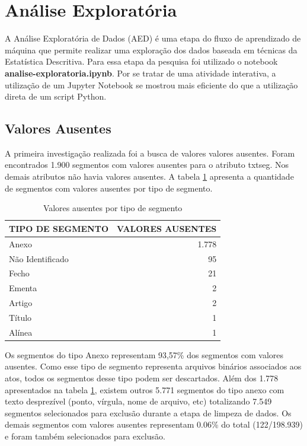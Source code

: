 \section{Análise Exploratória}

A Análise Exploratória de Dados (AED) é uma etapa do fluxo de aprendizado de máquina que permite realizar uma exploração dos dados baseada em técnicas da Estatística Descritiva. Para essa etapa da pesquisa foi utilizado o notebook \textbf{analise-exploratoria.ipynb}. Por se tratar de uma atividade interativa, a utilização de um Jupyter Notebook se mostrou mais eficiente do que a utilização direta de um script Python.

\subsection{Valores Ausentes}

A primeira investigação realizada foi a busca de valores valores ausentes. Foram encontrados 1.900 segmentos com valores ausentes para o atributo txt\textunderscore seg. Nos demais atributos não havia valores ausentes. A tabela \ref{tab:valores-ausentes} apresenta a quantidade de segmentos com valores ausentes por tipo de segmento.

\begin{table}[h] 
\caption{Valores ausentes por tipo de segmento}
\label{tab:valores-ausentes}
	\begin{center} 
		\begin{tabular}{|l|r|} 
			\hline TIPO DE SEGMENTO & VALORES AUSENTES \\
			\hline
			\hline Anexo & 1.778 \\
			\hline Não Identificado & 95 \\			
			\hline Fecho & 21 \\
			\hline Ementa & 2 \\			
			\hline Artigo & 2 \\
			\hline Título & 1 \\
			\hline Alínea & 1 \\			
			\hline
		\end{tabular}
	\end{center}
	\fdp
\end{table} 

Os segmentos do tipo Anexo representam 93,57\% dos segmentos com valores ausentes. Como esse tipo de segmento representa arquivos binários associados aos atos, todos os segmentos desse tipo podem ser descartados. Além dos 1.778 apresentados na tabela \ref{tab:valores-ausentes}, existem outros 5.771 segmentos do tipo anexo com texto desprezível (ponto, vírgula, nome de arquivo, etc) totalizando 7.549 segmentos selecionados para exclusão durante a etapa de limpeza de dados. Os demais segmentos com valores ausentes representam 0.06\% do total (122/198.939) e foram também selecionados para exclusão.

